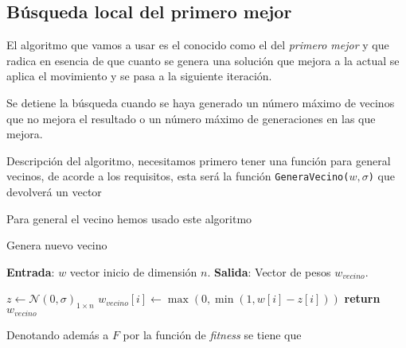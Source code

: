 \subsection{Búsqueda local del primero mejor}  

El algoritmo que vamos a usar es el conocido como el del \textit{primero mejor} y que radica en esencia de que  cuanto se genera 
una solución que mejora a la actual se aplica el movimiento y se pasa a la siguiente iteración.

Se detiene la búsqueda cuando se haya generado un número máximo de vecinos que no mejora el resultado
o un número máximo de generaciones en las que mejora.

Descripción del algoritmo, necesitamos primero tener una función para general vecinos, de acorde a los requisitos, esta será 
la función \texttt{GeneraVecino($w,\sigma$)} que devolverá un vector 


  Para general el vecino hemos usado este algoritmo 

  \begin{algorithm}[H]
    \caption{Genera nuevo vecino}
    \hspace*{\algorithmicindent} 

        \textbf{Entrada}: $w$ vector inicio de dimensión $n$. 
        \hspace*{\algorithmicindent} 
        \textbf{Salida}:
        Vector de pesos $w_{vecino}$.        
    \begin{algorithmic}[1]
          \State $z \gets \mathcal{N}(0, \sigma)_{1 \times n}$
          \State $w_{vecino}[i] \gets \max(0, \min(1, w[i]-z[i]))$
        \EndFor
        \State \textbf{return} $w_{vecino}$
      \EndProcedure
    \end{algorithmic}
  \end{algorithm}

Denotando además a $F$ por la función de \textit{fitness} se tiene que  

